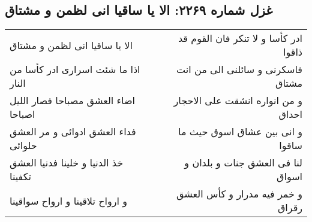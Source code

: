 \begin{center}
\section*{غزل شماره ۲۲۶۹: الا یا ساقیا انی لظمن و مشتاق}
\label{sec:2269}
\begin{longtable}{l p{0.5cm} r}
الا یا ساقیا انی لظمن و مشتاق
&&
ادر کأسا و لا تنکر فان القوم قد ذاقوا
\\
اذا ما شئت اسراری ادر کأسا من النار
&&
فاسکرنی و سائلنی الی من انت مشتاق
\\
اضاء العشق مصباحا فصار اللیل اصباحا
&&
و من انواره انشقت علی الاحجار احداق
\\
فداء العشق ادوائی و مر العشق حلوائی
&&
و انی بین عشاق اسوق حیث ما ساقوا
\\
خذ الدنیا و خلینا فدنیا العشق تکفینا
&&
لنا فی العشق جنات و بلدان و اسواق
\\
و ارواح تلاقینا و ارواح سواقینا
&&
و خمر فیه مدرار و کأس العشق رقراق
\\
\end{longtable}
\end{center}
